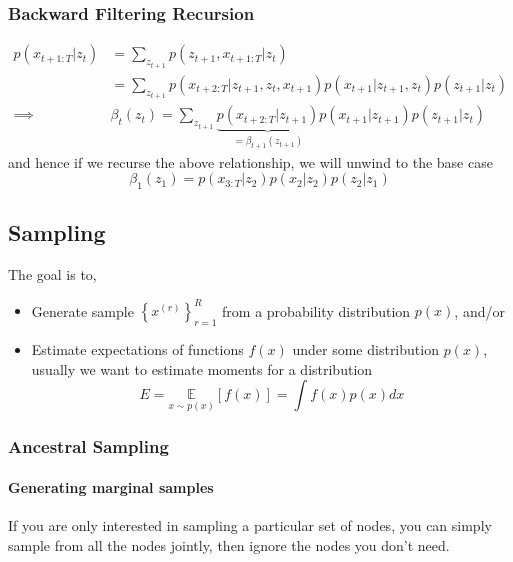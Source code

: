 \documentclass[11pt]{article}
\begin{document}
\subsubsection{Backward Filtering Recursion}
\begin{align*}
    p\left(x_{t+1: T} | z_{t}\right)
    &=\sum_{z_{t+1}} p\left(z_{t+1}, x_{t+1: T} | z_{t}\right) \\
    &= \sum_{z_{t+1}} p\left(x_{t+2: T} | z_{t+1}, z_{t}, x_{t+1}\right) p\left(x_{t+1} | z_{t+1}, z_{t}\right) p\left(z_{t+1} | z_{t}\right) \\
    \implies &\beta_{t}\left(z_{t}\right)=\sum_{z_{t+1}} \underbrace{ p\left(x_{t+2 : T} | z_{t+1}\right)}_{ = \beta_{t +1}(z_{t + 1})} p\left(x_{t+1} | z_{t+1}\right) p\left(z_{t+1} | z_{t}\right)
\end{align*}
and hence if we recurse the above relationship, we will unwind to the base case
\begin{equation*}
    \beta_{1}\left(z_{1}\right)=p\left(x_{3: T} | z_{2}\right) p\left(x_{2} | z_{2}\right) p\left(z_{2} | z_{1}\right)
\end{equation*}


\subsection{Sampling}
The goal is to, 
\begin{itemize}
    \item Generate sample $\left\{x^{(r)}\right\}_{r=1}^{R}$ from a probability distribution $p(x)$, and/or
    \item Estimate expectations of functions $f(x)$ under some distribution $p(x)$, usually we want to estimate moments for a distribution
    \begin{equation*}
        E=\underset{x \sim p(x)}{\mathbb{E}}[f(x)]=\int f(x) p(x) d x
    \end{equation*}
\end{itemize}

\subsubsection{Ancestral Sampling}
\paragraph{Generating marginal samples} If you are only interested in sampling a particular set of nodes, you can simply sample from all the nodes jointly, then ignore the nodes you don't need.
\end{document}

